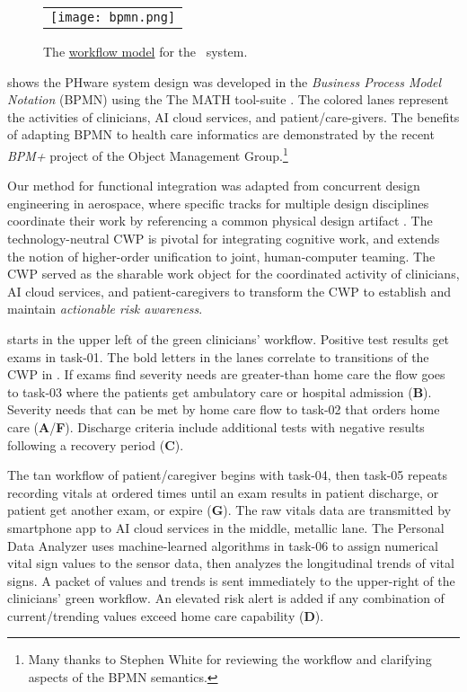 \begin{figure*}
  \begin{center}
    \begin{tabular}{c}
      \texttt{[image: bpmn.png]}
    \end{tabular}
  \end{center}
\caption{The \href{https://github.com/ericmercer/SPIN-bpmn-cwp-verification-paper/blob/main/16-Feb-2022-BPMN-resources.png}{workflow model} for the \phware\ system.}
\label{fig:bpmn}
\end{figure*}

 shows the PHware system design was developed in the \emph{Business Process Model Notation} (BPMN) \cite{BPMN} \cite{BPMNSpecification} using the The MATH tool-suite \cite{workflowmodel}.
The colored lanes represent the activities of clinicians, AI cloud services, and patient/care-givers.
The benefits of adapting BPMN to health care informatics are demonstrated by the recent \emph{BPM+} project of the Object Management Group.\footnote{Many thanks to Stephen White for reviewing the workflow and clarifying aspects of the BPMN semantics.}

Our method for functional integration was adapted from concurrent design engineering in aerospace, where specific tracks for multiple design disciplines coordinate their work by referencing a common physical design artifact \cite{10.1007/978-1-4471-1538-0_9}.
The technology-neutral CWP is pivotal for integrating cognitive work, and extends the notion of higher-order unification \cite{10.1007/3-540-45685-6_2} to joint, human-computer teaming. The CWP served as the sharable work object for the coordinated activity of clinicians, AI cloud services, and patient-caregivers to transform the CWP to establish and maintain \emph{actionable risk awareness}.

 starts in the upper left of the green clinicians' workflow.
Positive test results get exams in task-01. The bold letters in the lanes correlate to transitions of the CWP in .
If exams find severity needs are greater-than home care the flow goes to task-03 where the patients get ambulatory care or hospital admission (\textbf{B}).
Severity needs that can be met by home care flow to task-02 that orders home care (\textbf{A}/\textbf{F}).
Discharge criteria include additional tests with negative results following a recovery period (\textbf{C}).

The tan workflow of patient/caregiver begins with task-04, then task-05 repeats recording vitals at ordered times until an exam results in patient discharge, or patient get another exam, or expire (\textbf{G}). 
The raw vitals data are transmitted by smartphone app to AI cloud services in the middle, metallic lane. The Personal Data Analyzer uses machine-learned algorithms in task-06 to assign numerical vital sign values to the sensor data, then analyzes the longitudinal trends of vital signs.
A packet of values and trends is sent immediately to the upper-right of the clinicians' green workflow. An elevated risk alert is added if any combination of current/trending values exceed home care capability (\textbf{D}).

